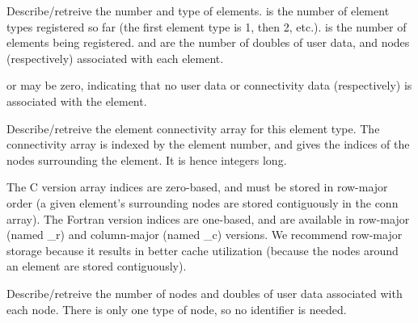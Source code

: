 \documentclass[10pt]{article}
\begin{document}
     Describe/retreive the number and type of elements.   is the
number of element types registered so far (the first element type is 1, then 2,
etc.).   is the number of elements being registered.  
and  are the number of doubles of user data, and nodes
(respectively) associated with each element.

      or  may be zero, indicating that no user
data or connectivity data (respectively) is associated with the element.


     Describe/retreive the element connectivity array for this element
     type.  The connectivity array is indexed by the element number,
     and gives the indices of the nodes surrounding the element.  It is
     hence  integers long.

     The C version array indices are zero-based, and must be stored in
     row-major order (a given element's surrounding nodes are stored
     contiguously in the conn array).  The Fortran version indices are
     one-based, and are available in row-major (named \_r) and
     column-major (named \_c) versions.  We recommend row-major storage
     because it results in better cache utilization (because the nodes
     around an element are stored contiguously).


     Describe/retreive the number of nodes and doubles of user data
     associated with each node.  There is only one type of node, so no
      identifier is needed.
\end{document}
